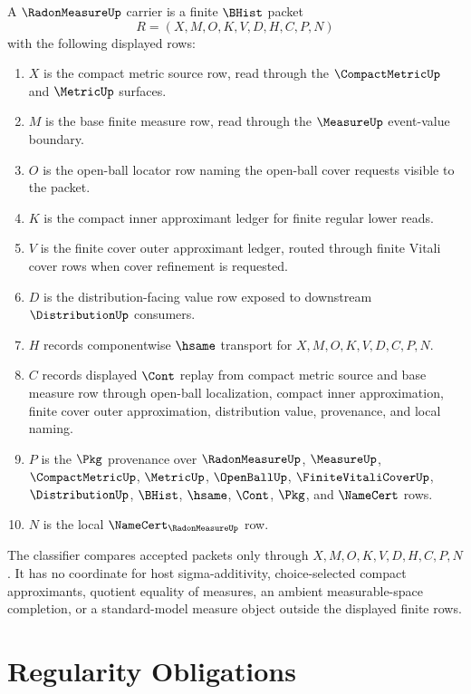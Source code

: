 \begin{definition}
\label{def:radon-measure-carrier}
A $\RadonMeasureUp$ carrier is a finite $\BHist$ packet
$$
R=(X,M,O,K,V,D,H,C,P,N)
$$
with the following displayed rows:
\begin{enumerate}
\item $X$ is the compact metric source row, read through the $\CompactMetricUp$ and $\MetricUp$ surfaces.
\item $M$ is the base finite measure row, read through the $\MeasureUp$ event-value boundary.
\item $O$ is the open-ball locator row naming the open-ball cover requests visible to the packet.
\item $K$ is the compact inner approximant ledger for finite regular lower reads.
\item $V$ is the finite cover outer approximant ledger, routed through finite Vitali cover rows when cover refinement is requested.
\item $D$ is the distribution-facing value row exposed to downstream $\DistributionUp$ consumers.
\item $H$ records componentwise $\hsame$ transport for $X,M,O,K,V,D,C,P,N$.
\item $C$ records displayed $\Cont$ replay from compact metric source and base measure row through open-ball localization, compact inner approximation, finite cover outer approximation, distribution value, provenance, and local naming.
\item $P$ is the $\Pkg$ provenance over $\RadonMeasureUp$, $\MeasureUp$, $\CompactMetricUp$, $\MetricUp$, $\OpenBallUp$, $\FiniteVitaliCoverUp$, $\DistributionUp$, $\BHist$, $\hsame$, $\Cont$, $\Pkg$, and $\NameCert$ rows.
\item $N$ is the local $\NameCert_{\RadonMeasureUp}$ row.
\end{enumerate}
The classifier compares accepted packets only through $X,M,O,K,V,D,H,C,P,N$. It has no coordinate for host sigma-additivity, choice-selected compact approximants, quotient equality of measures, an ambient measurable-space completion, or a standard-model measure object outside the displayed finite rows.
\end{definition}

\section{Regularity Obligations}
\label{sec:radon-measure-obligations}

